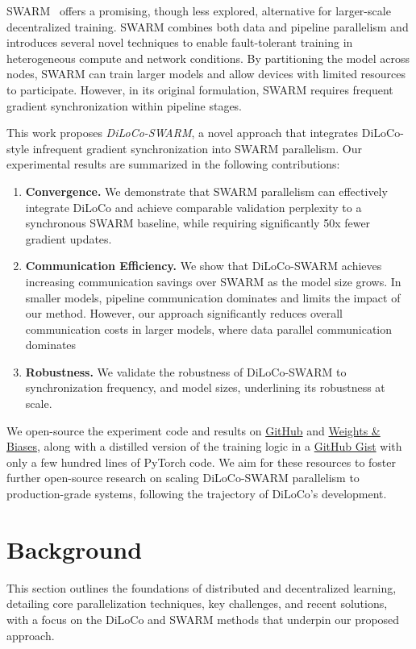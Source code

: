 \documentclass{article}
\newcommand{\github}{\href{https://github.com/mikasenghaas/diloco-swarm}{GitHub}}
\newcommand{\wandb}{\href{https://wandb.ai/mikasenghaas/diloco-swarm}{Weights \& Biases}}
\newcommand{\gist}{\href{https://gist.github.com/mikasenghaas/5fa1aa77ea69f187f531a5889983c249}{GitHub Gist}}
\begin{document}
SWARM~\cite{ryabinin2023swarm} offers a promising, though less explored, alternative for larger-scale decentralized training. SWARM combines both data and pipeline parallelism and introduces several novel techniques to enable fault-tolerant training in heterogeneous compute and network conditions. By partitioning the model across nodes, SWARM can train larger models and allow devices with limited resources to participate. However, in its original formulation, SWARM requires frequent gradient synchronization within pipeline stages. 

This work proposes \textit{DiLoCo-SWARM}, a novel approach that integrates DiLoCo-style infrequent gradient synchronization into SWARM parallelism. Our experimental results are summarized in the following contributions:

\begin{enumerate}
  \item \textbf{Convergence.} We demonstrate that SWARM parallelism can effectively integrate DiLoCo and achieve comparable validation perplexity to a synchronous SWARM baseline, while requiring significantly 50x fewer gradient updates.
  \item \textbf{Communication Efficiency.} We show that DiLoCo-SWARM achieves increasing communication savings over SWARM as the model size grows. In smaller models, pipeline communication dominates and limits the impact of our method. However, our approach significantly reduces overall communication costs in larger models, where data parallel communication dominates
  \item \textbf{Robustness.} We validate the robustness of DiLoCo-SWARM to synchronization frequency, and model sizes, underlining its robustness at scale.
\end{enumerate}

We open-source the experiment code and results on \github{} and \wandb{}, along with a distilled version of the training logic in a \gist{} with only a few hundred lines of PyTorch code. We aim for these resources to foster further open-source research on scaling DiLoCo-SWARM parallelism to production-grade systems, following the trajectory of DiLoCo's development.

\section{Background}

This section outlines the foundations of distributed and decentralized learning, detailing core parallelization techniques, key challenges, and recent solutions, with a focus on the DiLoCo and SWARM methods that underpin our proposed approach.
\end{document}
